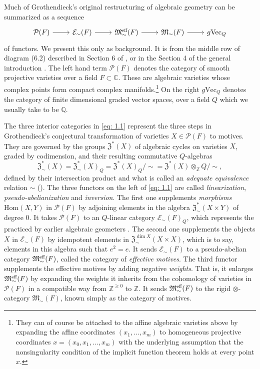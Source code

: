 \documentclass[preprint,12pt, leqno]{elsarticle}
\newcommand{\mQ}{\mathbb{Q}}
\newcommand{\mC}{\mathbb{C}}
\newcommand{\mZ}{\mathbb{Z}}
\newcommand{\cP}{\mathcal{P}}
\newcommand{\cE}{\mathcal{E}}
\newcommand{\fM}{\mathfrak{M}}
\newcommand{\ubf}[1]{\textit{#1}}
\newcommand{\gvec}[1]{g\mbox{Vec}_{#1}}
\numberwithin{equation}{section}
\theoremstyle{named}
\begin{document}
Much of Grothendieck's original restructuring of algebraic geometry can be summarized as a sequence
\begin{equation}\label{eq: 1.1}
    \begin{tikzcd}
        \cP(F) \ar[r] & \mathcal{E}_{\sim}(F) \ar[r] & \fM^{\scalebox{0.7}{\mbox{eff}}}_{\sim}(F)  \ar[r] & \fM_{\sim}(F) \ar[r] & g\mbox{Vec}_Q
    \end{tikzcd}
\end{equation}
of functors. We present this only as background. It is from the middle row of diagram (6.2) described in Section 6 of \cite{N2}, or in the Section 4 of the general introduction \cite{Andre1}. The left hand term $\cP(F)$ denotes the category of smooth projective varieties over a field $F\subset\mC$. These are algebraic varieties whose complex points form compact complex manifolds.\footnote{They can of course be attached to the affine algebraic varieties above by expanding the affine coordinates $(x_1,\dots, x_m)$ to homogeneous projective coordinates $x = (x_0, x_1,\dots, x_m)$ with the underlying assumption that the nonsingularity condition of the implicit function theorem holds at every point $x$.}
On the right $\gvec{Q}$ denotes the category of finite dimensional graded vector spaces, over a field $Q$ which we usually take to be $\mQ$.

The three interior categories in \eqref{eq: 1.1} represent the three steps in Grothendieck's conjectural transformation of varieties $X\in\cP(F)$ to motives. They are governed by the groups $\mathfrak{Z}^{*}(X)$ of algebraic cycles on varieties $X$, graded by codimension, and their resulting commutative $Q$-algebras
\begin{equation*}
    \mathfrak{Z}^{*}_{\sim}(X) = \mathfrak{Z}^{*}_{\sim}(X)_Q = \mathfrak{Z}^{*}(X)_{Q}/\sim = \mathfrak{Z}^{*}(X)\otimes_{\mZ} Q/\sim,
\end{equation*}
defined by their intersection product and what is called an \ubf{adequate equivalence} relation $\sim$ (\cite[Section 3.1]{Andre1}). The three functors on the left of \eqref{eq: 1.1} are called \ubf{linearization}, \ubf{pseudo-abelianization} and \ubf{inversion}. The first one supplements \ubf{morphisms} $\mbox{Hom}(X, Y)$ in $\cP(F)$ by adjoining elements in the algebra $\mathfrak{Z}^{*}_{\sim}(X \times Y)$ of degree $0$. It takes $\cP(F)$ to an $Q$-linear category $\cE_{\sim}(F)_Q$, which represents the  practiced by earlier algebraic geometers \cite[Section 1.1]{Andre1}. The second one supplements the objects $X$ in $\cE_{\sim}(F)$ by idempotent elements in $\mathfrak{Z}^{\dim X}_{\sim}(X\times X)$, which is to say, elements in this algebra such that $e^2 = e$. It sends $\cE_{\sim}(F)$ to a pseudo-abelian category $\fM^{\scalebox{0.7}{\mbox{eff}}}_{\sim}(F)$, called the category of \ubf{effective motives}. The third functor supplements the effective motives by adding negative \ubf{weights}. That is, it enlarges $\fM^{\scalebox{0.7}{\mbox{eff}}}_{\sim}(F)$ by expanding the weights it inherits from the cohomology of varieties in $\cP(F)$ in a compatible way from $\mZ^{\ge 0}$ to $\mZ$. It sends $\fM^{\scalebox{0.7}{\mbox{eff}}}_{\sim}(F)$ to the rigid $\otimes$-category $\fM_{\sim}(F)$, known simply as the category of motives.
\end{document}
